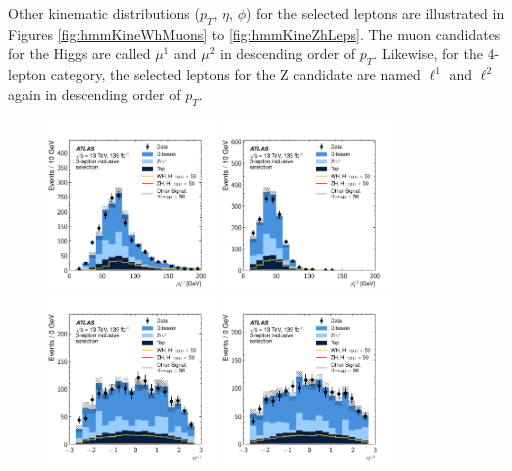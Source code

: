     
Other kinematic distributions ($p_T$, $\eta$, $\phi$) for the selected leptons are illustrated in Figures \ref{fig:hmmKineWhMuons} to \ref{fig:hmmKineZhLeps}.
The muon candidates for the Higgs are called $\mu^1$ and $\mu^2$ in descending order of $p_T$. 
Likewise, for the 4-lepton category, the selected leptons for the Z candidate are named $\ell^1$ and $\ell^2$ again in descending order of $p_T$.



\clearpage
\begin{figure}[htpb]
  \centering
  \includegraphics[width=0.4\textwidth]{figures/hmm/kinematics/histo-3lep-u1_pt.pdf}
  \includegraphics[width=0.4\textwidth]{figures/hmm/kinematics/histo-3lep-u2_pt.pdf}
  \includegraphics[width=0.4\textwidth]{figures/hmm/kinematics/histo-3lep-u1_eta.pdf}
  \includegraphics[width=0.4\textwidth]{figures/hmm/kinematics/histo-3lep-u2_eta.pdf}

\end{figure}
